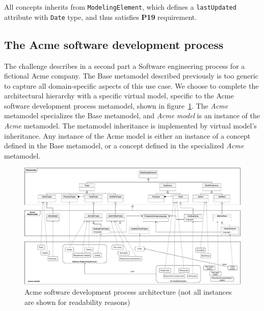 All concepts inherits from \texttt{ModelingElement}, which defines a \texttt{lastUpdated} attribute with \texttt{Date} type, and thus satisfies \textbf{P19} requirement. 

\subsection{The Acme software development process}
\label{sec:AcmeSoftwareDevelopmentProcess}

The challenge describes in a second part a Software engineering process for a fictional Acme company. The Base metamodel described previously is too generic to capture all domain-specific aspects of this use case. We choose to complete the architectural hierarchy with a specific virtual model, specific to the Acme software development process metamodel, shown in figure~\ref{fig:AcmeFullArchitecture}. 
The \textit{Acme} metamodel specializes the Base metamodel, and \textit{Acme model} is an instance of the \textit{Acme} metamodel. The metamodel inheritance is implemented by virtual model's inheritance. Any instance of the Acme model is either an instance of a concept defined in the Base metamodel, or a concept defined in the specialized \textit{Acme} metamodel.


\begin{figure}
 \centering
     \includegraphics[width=1.0 \textwidth]{Figures/AcmeFullArchitecture.pdf}
     \caption{Acme software development process architecture (not all instances are shown for readability reasons)}
    \label{fig:AcmeFullArchitecture}
\end{figure}

